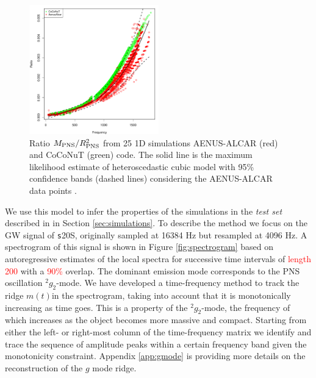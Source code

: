 \begin{figure}
 \centering
 \includegraphics[width=0.5\textwidth]{plots/model}
 \caption{Ratio $M_{\rm PNS}/R_{\rm PNS}^2$ from 25 1D simulations {\sc AENUS-ALCAR} (red) and {\sc CoCoNuT} (green) code. The solid line is the maximum likelihood estimate of heteroscedastic cubic model with 95\% confidence bands (dashed lines) considering  the  {\sc AENUS-ALCAR} data points . } \label{fig:LMVAR}
\end{figure}

{We use this model to infer the properties of the simulations in the 
{\it test set} described in in Section \ref{sec:simulations}.}
To describe the method we focus on the GW signal
of {\texttt s20S}, originally
sampled at 16384 Hz but resampled at 4096 Hz.
A spectrogram of this signal is shown in Figure \ref{fig:spectrogram} based on
autoregressive estimates of the local spectra for successive time intervals of 
\textcolor{red}{length 200} with a \textcolor{red}{ 90\%} overlap.
The dominant emission mode corresponds to the PNS oscillation $\mbox{}^2 g_2$-mode. We have
developed a time-frequency method to track the ridge $m(t) $in the spectrogram,
taking into account that it is monotonically increasing as time goes. 
{This is a property of the $\mbox{}^2 g_2$-mode, the frequency of which  
increases as the object becomes more massive and compact}.
Starting from either the left- or right-most column of the time-frequency matrix
we identify and trace the sequence of amplitude peaks within a certain frequency
band given the monotonicity constraint. Appendix \ref{app:gmode} is providing more
details on the reconstruction of the $g$ mode ridge. 


